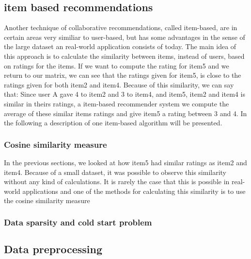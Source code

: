 
\subsection{item based recommendations} %
\label{sub:item_based_recommendations}
Another technique of collaborative recommendations, called item-based, are in certain areas very similiar to user-based, but has some advantages in the sense of the large dataset an real-world application consists of today. The main idea of this approach is to calculate the similarity between items, instead of users, based on ratings for the items. If we want to compute the rating for item5 and we return to our matrix, we can see that the ratings given for item5, is close to the ratings given for both item2 and item4. Because of this similarity, we can say that: Since user A gave 4 to item2 and 3 to item4, and item5, item2 and item4 is similar in theirs ratings, a item-based recommender system we compute the average of these similar items ratings and give item5 a rating between 3 and 4. 
In the following a description of one item-based algorithm will be presented. 
\subsubsection{Cosine similarity measure}
In the previous sections, we looked at how item5 had similar ratings as item2 and item4. Because of a small dataset, it was possible to observe this similarity without any kind of calculations. It is rarely the case that this is possible in real-world applications and one of the methods for calculating this similarity is to use the cosine similarity measure
\subsubsection{Data sparsity and cold start problem}

\subsection{Data preprocessing} %
\label{sub:data_preprocessing}

